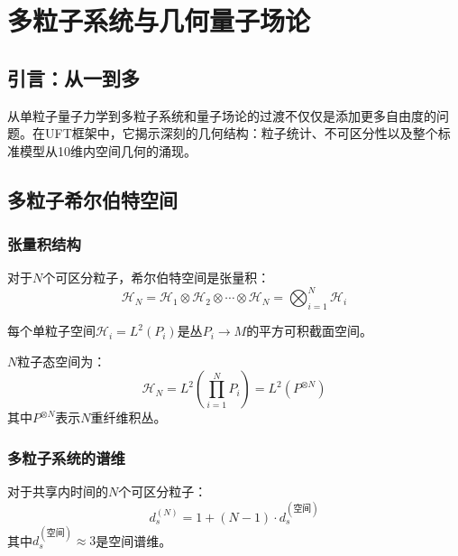 \section{多粒子系统与几何量子场论}
\label{sec:multiparticle_qft}

\subsection{引言：从一到多}

从单粒子量子力学到多粒子系统和量子场论的过渡不仅仅是添加更多自由度的问题。在UFT框架中，它揭示深刻的几何结构：粒子统计、不可区分性以及整个标准模型从10维内空间几何的涌现。

\subsection{多粒子希尔伯特空间}

\subsubsection{张量积结构}

对于$N$个可区分粒子，希尔伯特空间是张量积：
\begin{equation}
    \mathcal{H}_N = \mathcal{H}_1 \otimes \mathcal{H}_2 \otimes \cdots \otimes \mathcal{H}_N = \bigotimes_{i=1}^N \mathcal{H}_i
\end{equation}

每个单粒子空间$\mathcal{H}_i = L^2(P_i)$是丛$P_i \to M$的平方可积截面空间。

\begin{definition}[多粒子态空间]
$N$粒子态空间为：
\begin{equation}
    \mathcal{H}_N = L^2\left(\prod_{i=1}^N P_i\right) = L^2(P^{\otimes N})
\end{equation}
其中$P^{\otimes N}$表示$N$重纤维积丛。
\end{definition}

\subsubsection{多粒子系统的谱维}

\begin{theorem}[谱维缩放]
对于共享内时间的$N$个可区分粒子：
\begin{equation}
    d_s^{(N)} = 1 + (N-1) \cdot d_s^{(\text{空间})}
\end{equation}
其中$d_s^{(\text{空间})} \approx 3$是空间谱维。
\end{theorem}

